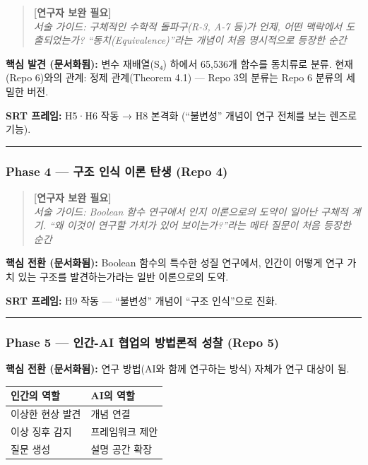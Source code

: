 \documentclass[
]{article}
\newcounter{none} %
\begin{document}
\begin{quote}
\textbf{{[}연구자 보완 필요{]}}\\
\emph{서술 가이드: 구체적인 수학적 돌파구(R-3, A-7 등)가 언제, 어떤
맥락에서 도출되었는가? ``동치(Equivalence)''라는 개념이 처음 명시적으로
등장한 순간}
\end{quote}

\textbf{핵심 발견 (문서화됨):} 변수 재배열(S₄) 하에서 65,536개 함수를
동치류로 분류. 현재(Repo 6)와의 관계: 정제 관계(Theorem 4.1) --- Repo
3의 분류는 Repo 6 분류의 세밀한 버전.

\textbf{SRT 프레임:} H5·H6 작동 → H8 본격화 (``불변성'' 개념이 연구
전체를 보는 렌즈로 기능).

\begin{center}\rule{0.5\linewidth}{0.5pt}\end{center}

\subsubsection{Phase 4 --- 구조 인식 이론 탄생 (Repo
4)}\label{phase-4-uxad6cuxc870-uxc778uxc2dd-uxc774uxb860-uxd0c4uxc0dd-repo-4}

\begin{quote}
\textbf{{[}연구자 보완 필요{]}}\\
\emph{서술 가이드: Boolean 함수 연구에서 인지 이론으로의 도약이 일어난
구체적 계기. ``왜 이것이 연구할 가치가 있어 보이는가?''라는 메타 질문이
처음 등장한 순간}
\end{quote}

\textbf{핵심 전환 (문서화됨):} Boolean 함수의 특수한 성질 연구에서,
인간이 어떻게 연구 가치 있는 구조를 발견하는가라는 일반 이론으로의 도약.

\textbf{SRT 프레임:} H9 작동 --- ``불변성'' 개념이 ``구조 인식''으로
진화.

\begin{center}\rule{0.5\linewidth}{0.5pt}\end{center}

\subsubsection{Phase 5 --- 인간-AI 협업의 방법론적 성찰 (Repo
5)}\label{phase-5-uxc778uxac04-ai-uxd611uxc5c5uxc758-uxbc29uxbc95uxb860uxc801-uxc131uxcc30-repo-5}

\textbf{핵심 전환 (문서화됨):} 연구 방법(AI와 함께 연구하는 방식) 자체가
연구 대상이 됨.

{\def\LTcaptype{none} %
\begin{longtable}[]{@{}ll@{}}
\toprule\noalign{}
인간의 역할 & AI의 역할 \\
\midrule\noalign{}
\endhead
\bottomrule\noalign{}
\endlastfoot
이상한 현상 발견 & 개념 연결 \\
이상 징후 감지 & 프레임워크 제안 \\
질문 생성 & 설명 공간 확장 \\
\end{longtable}
}
\end{document}
